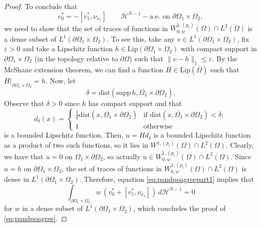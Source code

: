 \documentclass[reqno,12pt]{amsart}
\numberwithin{equation}{section}
\newcommand{\twopartdef}[4]
{
	\left\{
	\begin{array}{ll}
		#1 & #2 \\
		#3 & #4
	\end{array}
	\right.
}
\begin{document}
\begin{proof}
To conclude that
\begin{equation}\label{eq:pandpoagree}
v_0^* = - [v_1^*, \nu_{x_1}] \qquad \mathcal{H}^{N-1}-\mbox{a.e. on } \partial\Omega_1 \times \Omega_2,
\end{equation}
we need to show that the set of traces of functions in $W_{0,w}^{1,(p_i)}(\Omega) \cap L^2(\Omega)$ is a dense subset of $L^1(\partial\Omega_1 \times \Omega_2)$. To see this, take any $v \in L^1(\partial\Omega_1 \times \Omega_2)$, fix $\varepsilon > 0$ and take a Lipschitz function $h \in \mathrm{Lip}(\partial\Omega_1 \times \Omega_2)$ with compact support in $\partial\Omega_1 \times \Omega_2$ (in the topology relative to $\partial\Omega$) such that $\| v - h \|_1 \leq \varepsilon$. By the McShane extension theorem, we can find a function $H \in \mathrm{Lip}(\overline{\Omega})$ such that $H|_{\partial\Omega_1 \times \Omega_2} = h$. Now, let
\begin{equation}
\delta = \mathrm{dist}(\mathrm{supp} \, h, \overline{\Omega_1} \times \partial\Omega_2).
\end{equation}
Observe that $\delta > 0$ since $h$ has compact support and that
\begin{equation}
d_\delta(x) = \twopartdef{\frac{1}{\delta} \mathrm{dist}(x, \overline{\Omega_1} \times \partial\Omega_2)}{\mbox{if } \mathrm{dist}(x, \overline{\Omega_1} \times \partial\Omega_2) < \delta;}{1}{\mbox{otherwise}}
\end{equation}
is a bounded Lipschitz function. Then, $u = H d_\delta$ is a bounded Lipschitz function as a product of two such functions, so it lies in $W^{1,(p_i)}(\Omega) \cap L^2(\Omega)$. Clearly, we have that $u = 0$ on $\Omega_1 \times \partial\Omega_2$, so actually $u \in W_{0,w}^{1,(p_i)}(\Omega) \cap L^2(\Omega)$. Since $u = h$ on $\partial\Omega_1 \times \Omega_2$, the set of traces of functions in $W_{0,w}^{1,(p_i)}(\Omega) \cap L^2(\Omega)$ is dense in $L^1(\partial\Omega_1 \times \Omega_2)$. Therefore, equation \eqref{eq:pandpoagreepart1} implies that
$$ \int_{\partial\Omega_1 \times \Omega_2} w \, (v_0^*  + [v_1^*, \nu_{x_1}]) \, d\mathcal{H}^{N-1} = 0$$
for $w$ in a dense subset of $L^1(\partial\Omega_1 \times \Omega_2)$, which concludes the proof of \eqref{eq:pandpoagree}.


\end{proof}
\end{document}

